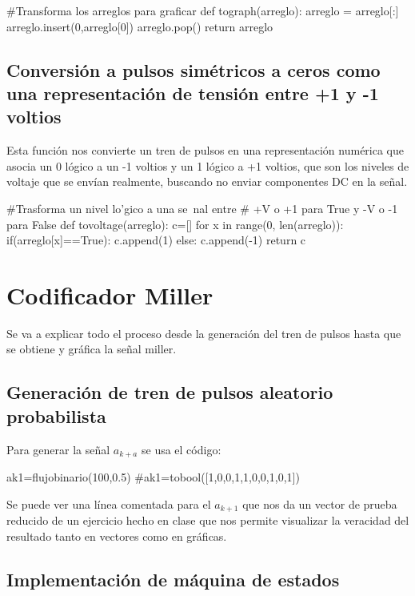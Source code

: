 \documentclass{article}
\begin{document}
\begin{python}
#Transforma los arreglos para graficar    
def tograph(arreglo):
    arreglo = arreglo[:]
    arreglo.insert(0,arreglo[0])
    arreglo.pop()
    return arreglo
\end{python}

\subsection{Conversión a pulsos simétricos a ceros como una representación de tensión entre +1 y -1 voltios}

Esta función nos convierte un tren de pulsos en una representación numérica que asocia un 0 lógico a un -1 voltios y un 1 lógico a +1 voltios, que son los niveles de voltaje que se envían realmente, buscando no enviar componentes DC en la señal.

\begin{python}
#Trasforma un nivel lo'gico a una se~nal entre
# +V o +1 para True y -V o -1 para False
def tovoltage(arreglo):
    c=[]    
    for x in range(0, len(arreglo)):
        if(arreglo[x]==True):
            c.append(1)
        else:
            c.append(-1)
    return c
\end{python}

\section {Codificador Miller}

Se va a explicar todo el proceso desde la generación del tren de pulsos hasta que se obtiene y gráfica la señal miller.

\subsection {Generación de tren de pulsos aleatorio probabilista}

Para generar la señal $a_{k+a}$ se usa el código:
\begin{python}
ak1=flujobinario(100,0.5)
#ak1=tobool([1,0,0,1,1,0,0,1,0,1])
\end{python}

Se puede ver una línea comentada para el $a_{k+1}$  que nos da un vector de prueba reducido de un ejercicio hecho en clase que nos permite visualizar la veracidad del resultado tanto en vectores como en gráficas.

\subsection{Implementación de máquina de estados}
\end{document}

